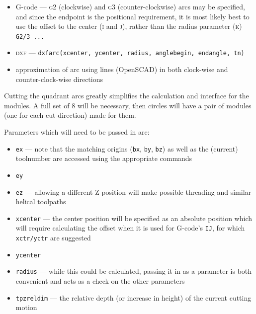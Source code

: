\documentclass{ltxdoc}
\begin{document}
\begin{itemize}
\item G-code --- \textsc{g2} (clockwise) and \textsc{g3} (counter-clockwise) arcs may be specified, 
      and since the endpoint is the positional requirement, it is most likely best to use the offset 
      to the center (\textsc{i} and \textsc{j}), rather than the radius parameter (\textsc{k}) 
      \texttt{G2/3 ...} 
\item \textsc{dxf} --- \texttt{dxfarc(xcenter, ycenter, radius, anglebegin, endangle, tn)}
\item approximation of arc using lines (OpenSCAD) in both clock-wise and counter-clock-wise directions
\end{itemize}
 
Cutting the quadrant arcs greatly simplifies the calculation and interface for the modules. A full set of 8 will be necessary, then circles will have a pair of modules (one for each cut direction) made for them.
 

Parameters which will need to be passed in are:
 
\begin{itemize}
 \item \texttt{ex} --- note that the matching origins (\verb|bx|, \verb|by|, \verb|bz|) as well as 
                       the (current) toolnumber are accessed using the appropriate commands
 \item \texttt{ey}
 \item \texttt{ez} --- allowing a different Z position will make possible threading and
                       similar helical toolpaths
\item \texttt{xcenter} --- the center position will be specified as an absolute position
      which will require calculating the offset when it is used for G-code's \texttt{IJ},
      for which \texttt{xctr/yctr} are suggested 
\item \texttt{ycenter}
\item \texttt{radius} --- while this could be calculated, passing it in as a parameter
      is both convenient and acts as a check on the other parameters
\item \texttt{tpzreldim} --- the relative depth (or increase in height) of the current cutting motion
\end{itemize}
\end{document}
